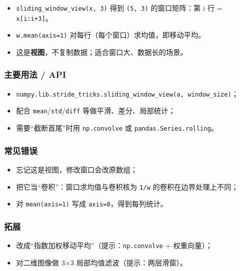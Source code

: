 \begin{itemize}
\tightlist
\item
  \texttt{sliding\_window\_view(x,\ 3)} 得到 \texttt{(5,\ 3)}
  的窗口矩阵：第 i 行 = \texttt{x{[}i:i+3{]}}。
\item
  \texttt{w.mean(axis=1)} 对每行（每个窗口）求均值，即移动平均。
\item
  这是\textbf{视图}，不复制数据；适合窗口大、数据长的场景。
\end{itemize}

\subsubsection{主要用法 / API}\label{ux4e3bux8981ux7528ux6cd5-api-3}

\begin{itemize}
\tightlist
\item
  \texttt{numpy.lib.stride\_tricks.sliding\_window\_view(a,\ window\_size)}；
\item
  配合 \texttt{mean}/\texttt{std}/\texttt{diff}
  等做平滑、差分、局部统计；
\item
  需要``截断首尾''时用 \texttt{np.convolve} 或
  \texttt{pandas.Series.rolling}。
\end{itemize}

\subsubsection{常见错误}\label{ux5e38ux89c1ux9519ux8bef-3}

\begin{itemize}
\tightlist
\item
  忘记这是视图，修改窗口会改原数组；
\item
  把它当``卷积''：窗口求均值与卷积核为 \texttt{1/w}
  的卷积在边界处理上不同；
\item
  对 \texttt{mean(axis=1)} 写成 \texttt{axis=0}，得到每列统计。
\end{itemize}

\subsubsection{拓展}\label{ux62d3ux5c55-3}

\begin{itemize}
\tightlist
\item
  改成``指数加权移动平均''（提示：\texttt{np.convolve} + 权重向量）；
\item
  对二维图像做 3×3 局部均值滤波（提示：两层滑窗）。
\end{itemize}

